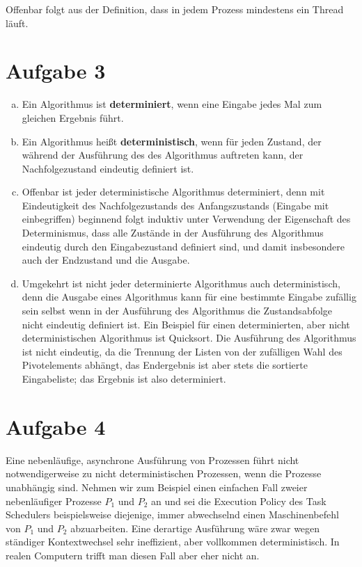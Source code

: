 \documentclass[numbers=noendperiod]{scrartcl}
\begin{document}
Offenbar folgt aus der Definition, dass in jedem Prozess mindestens ein Thread läuft.

\section*{Aufgabe 3}
\begin{enumerate}[a)]
	\item Ein Algorithmus ist \textbf{determiniert}, wenn eine Eingabe jedes Mal zum gleichen Ergebnis führt.
	\item Ein Algorithmus heißt \textbf{deterministisch}, wenn für jeden Zustand, der während der Ausführung des des Algorithmus auftreten kann, der Nachfolgezustand eindeutig definiert ist.
	\item Offenbar ist jeder deterministische Algorithmus determiniert, denn mit Eindeutigkeit des Nachfolgezustands des Anfangszustands (Eingabe mit einbegriffen) beginnend folgt induktiv unter Verwendung der Eigenschaft des Determinismus, dass alle Zustände in der Ausführung des Algorithmus eindeutig durch den Eingabezustand definiert sind, und damit insbesondere auch der Endzustand und die Ausgabe.
	\item Umgekehrt ist nicht jeder determinierte Algorithmus auch deterministisch, denn die Ausgabe eines Algorithmus kann für eine bestimmte Eingabe zufällig sein selbst wenn in der Ausführung des Algorithmus die Zustandsabfolge nicht eindeutig definiert ist. Ein Beispiel für einen determinierten, aber nicht deterministischen Algorithmus ist Quicksort. Die Ausführung des Algorithmus ist nicht eindeutig, da die Trennung der Listen von der zufälligen Wahl des Pivotelements abhängt, das Endergebnis ist aber stets die sortierte Eingabeliste; das Ergebnis ist also determiniert.
\end{enumerate}

\section*{Aufgabe 4}

Eine nebenläufige, asynchrone Ausführung von Prozessen führt nicht notwendigerweise zu nicht deterministischen Prozessen, wenn die Prozesse unabhängig sind. Nehmen wir zum Beispiel einen einfachen Fall zweier nebenläufiger Prozesse $P_1$ und $P_2$ an und sei die Execution Policy des Task Schedulers beispielsweise diejenige, immer abwechselnd einen Maschinenbefehl von $P_1$ und $P_2$ abzuarbeiten. Eine derartige Ausführung wäre zwar wegen ständiger Kontextwechsel sehr ineffizient, aber vollkommen deterministisch. In realen Computern trifft man diesen Fall aber eher nicht an.
\end{document}
